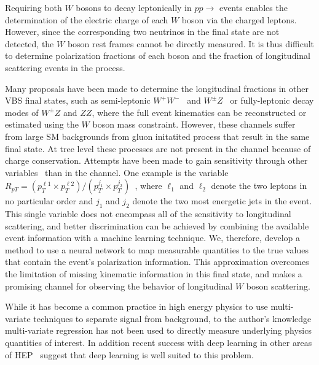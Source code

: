 Requiring both $W$ bosons to decay leptonically in  $pp
\to$ \ssWW events enables the determination of the electric charge of
each $W$ boson via the charged leptons. However, since the
corresponding two neutrinos in the final state are not detected, the
$W$ boson rest frames cannot be directly measured.  It is thus
difficult to determine polarization fractions of each boson and
the fraction of longitudinal scattering events in the \ssWW process.

Many proposals have been made to determine the longitudinal fractions in other VBS final states, such as semi-leptonic
$W^+W^-$~\cite{Han:2009em} and $W^\pm Z$~\cite{VBSCuts1} or
fully-leptonic decay modes of $W^\pm Z$ and $ZZ$, where the full
event kinematics can be reconstructed or estimated using the $W$ boson mass constraint. 
However, these channels suffer from large SM backgrounds from gluon initatited process that result in the same final state. At tree level these processes are not present in the \ssWW channel because of charge conservation. Attempts have been made 
to gain sensitivity through other variables~\cite{VBSCuts1,VBSME,Doroba:2012pd} than \ts in the \ssWW
channel. One example is the variable $R_{pT}=(p_{T}^{\ell 1} \times
p_{T}^{\ell 2}) / (p_T^{j_1} \times p_T^{j_2})$~\cite{Doroba:2012pd},
where $\ell_1$ and $\ell_2$ denote the two leptons in no particular
order and $j_1$ and $j_2$ denote the two most energetic jets in the
event. This single variable does not encompass all of the
sensitivity to longitudinal scattering, and better discrimination can
be achieved by combining the available event information with a
machine learning technique. We, therefore, develop a method to use a
neural network to map measurable quantities to the true \cts values
that contain the event's polarization information. This
approximation overcomes the limitation of missing kinematic information
in this final state, and makes \ssWW a promising channel for observing
the behavior of longitudinal $W$ boson scattering.
 
While it has become a common practice in high energy physics to use
multi-variate techniques to separate signal from background, to the
author's knowledge multi-variate regression has not been used to
directly measure underlying physics quantities of interest.
In addition recent success with deep learning in other areas of
HEP~\cite{Baldi:2014kfa,Baldi:2014pta} suggest that deep learning
is well suited to this problem.

